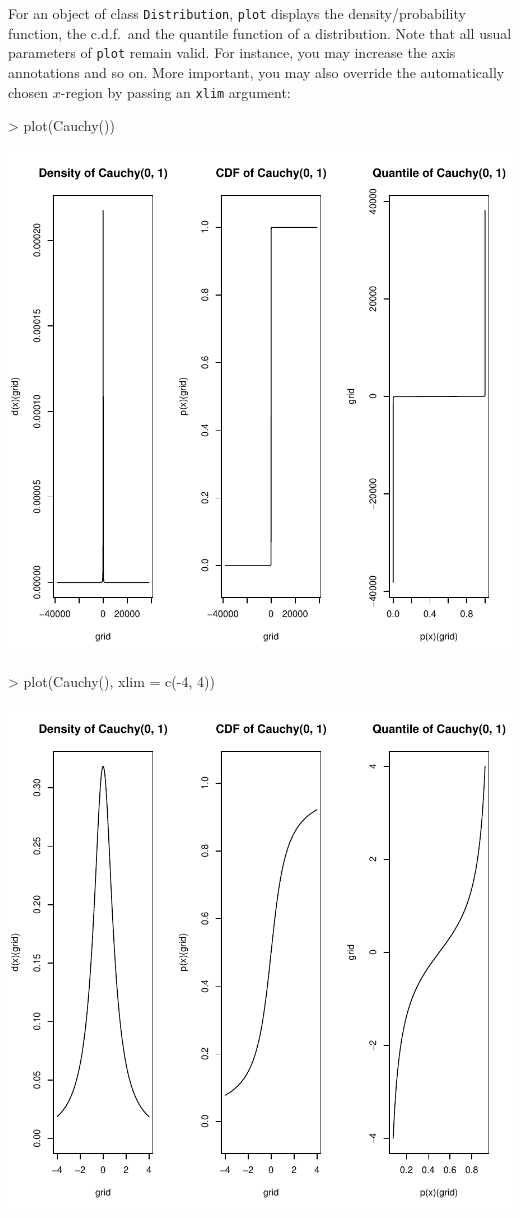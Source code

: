 \documentclass[11pt]{article}
\newcommand{\code}[1]{{\tt #1}}
\begin{document}
For an object of class \code{Distribution},
\code{plot} displays the density/probability function, the c.d.f.\ and the quantile function of
a distribution. Note that all usual parameters of \code{plot} remain valid. For instance,
you may increase the axis annotations and so on. More important, you may also 
override the automatically chosen $x$-region by passing an \code{xlim} argument:
\begin{Schunk}
\begin{Sinput}
> plot(Cauchy())
\end{Sinput}
\end{Schunk}
\includegraphics{distr-cauchy1}
\begin{Schunk}
\begin{Sinput}
> plot(Cauchy(), xlim = c(-4, 4))
\end{Sinput}
\end{Schunk}
\includegraphics{distr-cauchy2}
\end{document}
